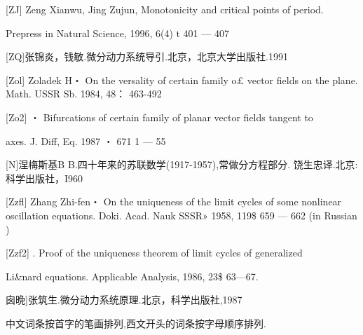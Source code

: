 {[}ZJ{]} Zeng Xianwu, Jing Zujun, Monotonicity and critical points of
period.

Prepress in Natural Science, 1996, 6(4) t 401 --- 407

{[}ZQ{]}张锦炎，钱敏.微分动力系统导引.北京，北京大学出版社.1991

{[}Zol{]} Zoladek H・ On the versality of certain family o£ vector
fields on the plane. Math. USSR Sb. 1984, 48： 463-492

{[}Zo2{]} ・ Bifurcations of certain family of planar vector fields
tangent to

axes. J. Diff, Eq. 1987 ・ 671 1 --- 55

{[}N{]}涅梅斯基B B.四十年来的苏联数学(1917-1957),常做分方程部分.
饶生忠译.北京:科学出版社，I960

{[}Zzfl{]} Zhang Zhi-fen・ On the uniqueness of the limit cycles of some
nonlinear oscillation equations. Doki. Acad. Nauk SSSR» 1958, 119\$ 659
--- 662 (in Russian )

{[}Zzf2{]} . Proof of the uniqueness theorem of limit cycles of
generalized

Li\&nard equations. Applicable Analysis, 1986, 23\$ 63---67.

囱晩{]}张筑生.微分动力系统原理.北京，科学出版社,1987

中文词条按首字的笔画排列,西文开头的词条按字母顺序排列.

